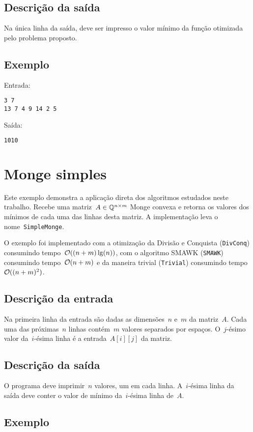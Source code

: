 \subsection*{Descrição da saída}
Na única linha da saída, deve ser impresso o valor mínimo da função otimizada pelo problema proposto.

\subsection*{Exemplo}
Entrada:
\begin{verbatim}
3 7
13 7 4 9 14 2 5
\end{verbatim}
Saída:
\begin{verbatim}
1010
\end{verbatim}

\section{Monge simples} \label{SimpleMonge}

Este exemplo demonstra a aplicação direta dos algoritmos estudados neste trabalho. Recebe uma matriz~$A \in \mathbb{Q}^{n \times m}$ Monge convexa e retorna os valores dos mínimos de cada uma das linhas desta matriz. A implementação leva o nome~\texttt{SimpleMonge}.

O exemplo foi implementado com a otimização da Divisão e Conquista (\texttt{DivConq}) consumindo tempo~$\mathcal{O}((n+m)\lg(n))$, com o algoritmo SMAWK (\texttt{SMAWK}) consumindo tempo~$\mathcal{O}(n+m)$ e da maneira trivial (\texttt{Trivial}) consumindo tempo~$\mathcal{O}((n+m)^2)$.

\subsection*{Descrição da entrada}

Na primeira linha da entrada são dadas as dimensões~$n$ e~$m$ da matriz~$A$. Cada uma das próximas~$n$ linhas contém~$m$ valores separados por espaços. O~$j$-ésimo valor da~$i$-ésima linha é a entrada~$A[i][j]$ da matriz.

\subsection*{Descrição da saída}

O programa deve imprimir~$n$ valores, um em cada linha. A~$i$-ésima linha da saída deve conter o valor de mínimo da~$i$-ésima linha de~$A$.

\subsection*{Exemplo}

